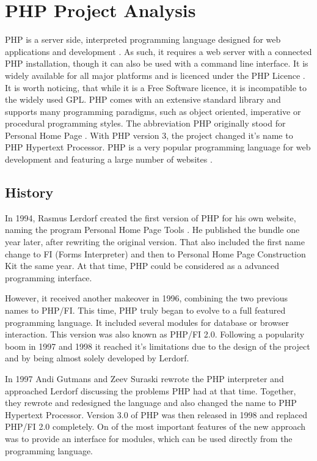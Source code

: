 \section{PHP Project Analysis} %


PHP is a server side, interpreted programming language designed for web
applications and development \cite{PHPIntro}. As such, it requires a web server
with a connected PHP installation, though it can also be used with a command
line interface. It is widely available for all major platforms and is licenced
under the PHP Licence \cite{PHPManual}. It is worth noticing, that while it is
a Free Software licence, it is incompatible to the widely used \ac{GPL}. PHP
comes with an extensive standard library and supports many programming
paradigms, such as object oriented, imperative or procedural programming
styles. The abbreviation PHP originally stood for Personal Home Page
\cite{PHPHistory}. With PHP version 3, the project changed it's name to PHP
Hypertext Processor. PHP is a very popular programming language for web
development and featuring a large number of websites
\cite{PHPW3Techs,PHPStats}.

\subsection{History} %

In 1994, Rasmus Lerdorf created the first version of PHP for his own website,
naming the program Personal Home Page Tools \cite{PHPHistory}. He published the
bundle one year later, after rewriting the original version. That also included
the first name change to FI (Forms Interpreter) and then to Personal Home Page
Construction Kit the same year. At that time, PHP could be considered as a
advanced programming interface.

However, it received another makeover in 1996, combining the two previous names
to PHP/FI. This time, PHP truly began to evolve to a full featured programming
language. It included several modules for database or browser interaction. This
version was also known as PHP/FI 2.0. Following a popularity boom in 1997 and
1998 it reached it's limitations due to the design of the project and by being
almost solely developed by Lerdorf.

In 1997 Andi Gutmans and Zeev Suraski rewrote the PHP interpreter and
approached Lerdorf discussing the problems PHP had at that time. Together, they
rewrote and redesigned the language and also changed the name to PHP Hypertext
Processor. Version 3.0 of PHP was then released in 1998 and replaced PHP/FI 2.0
completely. On of the most important features of the new approach was to
provide an interface for modules, which can be used directly from the
programming language.

